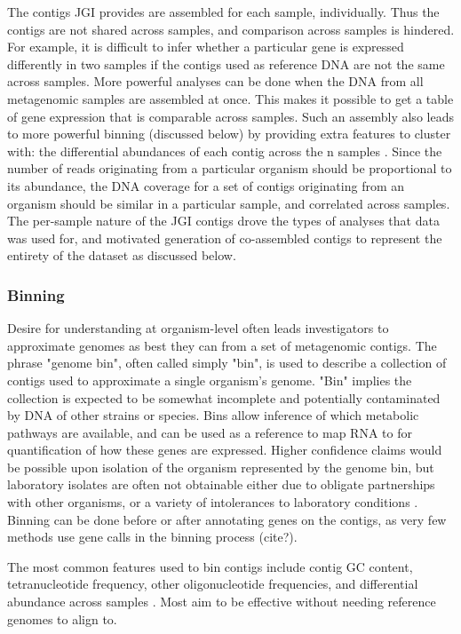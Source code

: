 The contigs JGI provides are assembled for each sample, individually.
Thus the contigs are not shared across samples, and comparison across samples is hindered.
For example, it is difficult to infer whether a particular gene is expressed differently in two samples if the contigs used as reference DNA are not the same across samples.
More powerful analyses can be done when the DNA from all metagenomic samples are assembled at once.
This makes it possible to get a table of gene expression that is comparable across samples.
Such an assembly also leads to more powerful binning (discussed below) by providing extra features to cluster with: the differential abundances of each contig across the n samples \cite{albertsen2013}.
Since the number of reads originating from a particular organism should be proportional to its abundance, the DNA coverage for a set of contigs originating from an organism should be similar in a particular sample, and correlated across samples.
The per-sample nature of the JGI contigs drove the types of analyses that data was used for, and motivated generation of co-assembled contigs to represent the entirety of the dataset as discussed below.

\subsubsection{Binning}
Desire for understanding at organism-level often leads investigators to approximate genomes as best they can from a set of metagenomic contigs.
The phrase "genome bin", often called simply "bin", is used to describe a collection of contigs used to approximate a single organism's genome.
"Bin" implies the collection is expected to be somewhat incomplete and potentially contaminated by DNA of other strains or species.
Bins allow inference of which metabolic pathways are available, and can be used as a reference to map RNA to for quantification of how these genes are expressed.
Higher confidence claims would be possible upon isolation of the organism represented by the genome bin, but laboratory isolates are often not obtainable either due to obligate partnerships with other organisms, or a variety of intolerances to laboratory conditions \cite{stewart2012}.
Binning can be done before or after annotating genes on the contigs, as very few methods use gene calls in the binning process (cite?).

The most common features used to bin contigs include contig GC content, tetranucleotide frequency, other oligonucleotide frequencies, and differential abundance across samples \cite{sangwan2016}.
Most aim to be effective without needing reference genomes to align to.

